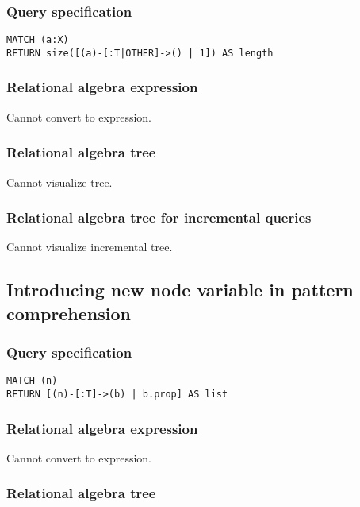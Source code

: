 \subsubsection*{Query specification}

\begin{lstlisting}
MATCH (a:X)
RETURN size([(a)-[:T|OTHER]->() | 1]) AS length
\end{lstlisting}

\subsubsection*{Relational algebra expression}

Cannot convert to expression.

\subsubsection*{Relational algebra tree}

Cannot visualize tree.

\subsubsection*{Relational algebra tree for incremental queries}

Cannot visualize incremental tree.

\subsection{Introducing new node variable in pattern comprehension}

\subsubsection*{Query specification}

\begin{lstlisting}
MATCH (n)
RETURN [(n)-[:T]->(b) | b.prop] AS list
\end{lstlisting}

\subsubsection*{Relational algebra expression}

Cannot convert to expression.

\subsubsection*{Relational algebra tree}

